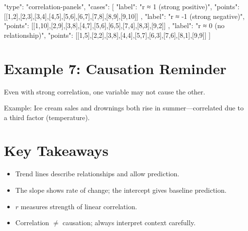 \documentclass[14pt]{extarticle}
\begin{document}
\begin{diagramdata}
{
  "type": "correlation-panels",
  "cases": [
    {
      "label": "r ≈ 1 (strong positive)",
      "points": [[1,2],[2,3],[3,4],[4,5],[5,6],[6,7],[7,8],[8,9],[9,10]]
    },
    {
      "label": "r ≈ -1 (strong negative)",
      "points": [[1,10],[2,9],[3,8],[4,7],[5,6],[6,5],[7,4],[8,3],[9,2]]
    },
    {
      "label": "r ≈ 0 (no relationship)",
      "points": [[1,5],[2,2],[3,8],[4,4],[5,7],[6,3],[7,6],[8,1],[9,9]]
    }
  ]
}
\end{diagramdata}

\section*{Example 7: Causation Reminder}

Even with strong correlation, one variable may not cause the other.


Example: Ice cream sales and drownings both rise in summer—correlated due to a third factor (temperature).

\section*{Key Takeaways}
\begin{itemize}
  \item Trend lines describe relationships and allow prediction.
  \item The slope shows rate of change; the intercept gives baseline prediction.
  \item \(r\) measures strength of linear correlation.
  \item Correlation $\neq$ causation; always interpret context carefully.
\end{itemize}

\newpage

\end{document}

